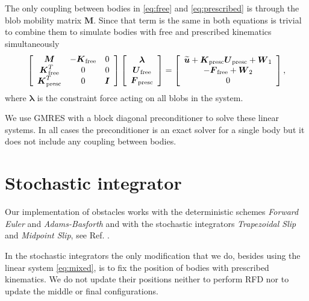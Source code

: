 \documentclass[a4paper,12pt,twoside]{revtex4}
\newcommand{\eqn}{\begin{eqnarray}}
\newcommand{\eqnend}{\end{eqnarray}}
\newcommand{\bs}[1]{\boldsymbol{#1}}
\newcommand{\wtil}[1]{\widetilde{#1}}
\newcommand{\tex}[1]{\mbox{\scriptsize{#1}}}
\def\bF{\bs{F}}
\def\bI{\bs{I}}
\def\bK{\bs{K}}
\def\bM{\bs{M}}
\def\bu{\bs{u}}
\def\bU{\bs{U}}
\def\bW{\bs{W}}
\def\blambda{\bs{\lambda}}
\begin{document}
The only coupling between bodies in \eqref{eq:free} and \eqref{eq:prescribed} is through the blob mobility matrix $\bM$. Since that term is the same in both equations is trivial to combine them to simulate bodies with free and prescribed kinematics simultaneously
\eqn
\left[ \begin{array}{ccc}
\bM & -\bK_{\tex{free}} & 0 \\
\bK_{\tex{free}}^T & 0 & 0 \\
\bK^T_{\tex{presc}} & 0 & \bI
\end{array}\right] 
\left[ \begin{array}{c}
\blambda \\
\bU_{\tex{free}} \\
\bF_{\tex{presc}}
\end{array}\right] = 
\left[ \begin{array}{c}
\wtil{\bu} + \bK_{\tex{presc}}\bU_{\tex{presc}} + \bW_1 \\
-\bF_{\tex{free}} + \bW_2 \\
0
\end{array}\right],
\label{eq:mixed}
\eqnend
where $\blambda$ is the constraint force acting on all blobs in the system.

We use GMRES with a block diagonal preconditioner to solve these linear systems.
In all cases the preconditioner is an exact solver for a single body but it does not include any coupling between bodies.


\section{Stochastic integrator}
Our implementation of obstacles works with the deterministic schemes \emph{Forward Euler} and \emph{Adams-Basforth} and with the stochastic integrators \emph{Trapezoidal Slip} and \emph{Midpoint Slip}, see Ref. \cite{Sprinkle2017}.

In the stochastic integrators the only modification that we do, besides using the linear system \eqref{eq:mixed}, is to fix the position of bodies with prescribed kinematics. We do not update their positions 
neither to perform RFD nor to update the middle or final configurations.
\end{document}

